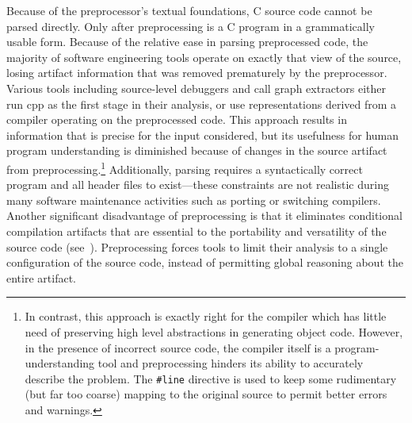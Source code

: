 \documentclass{article}
\newcommand{\Cpp}{\mbox{\textsf{cpp}}}
\newcommand{\C}{\mbox{C}}
\newcommand{\ppd}[1]{\texttt{\##1}}
\begin{document}
Because of the preprocessor's textual foundations, \C{} source code
cannot be parsed directly.  Only after preprocessing is a \C{}
program in a grammatically usable form. Because of the relative ease in
parsing preprocessed code, the majority of software engineering tools
operate on exactly that view of the source, losing artifact information
that was removed prematurely by the preprocessor.  Various tools including
source-level debuggers and call graph extractors
either run \Cpp{} as the first stage in their
analysis, or use representations derived from a compiler operating on
the preprocessed code.  This approach results in information that is
precise for the input considered, but its usefulness for human
program understanding is diminished because of changes in the source
artifact from preprocessing.\footnote{In contrast, this approach is
  exactly right for the compiler which has little need of preserving
  high level abstractions in generating object code.  However, in the
  presence of incorrect source code, the compiler itself is a
  program-understanding tool and preprocessing hinders its ability to
  accurately describe the problem.  The \ppd{line} directive is used to
  keep some rudimentary (but far too coarse) mapping to the original
  source to permit better errors and warnings.}  Additionally,
parsing requires a syntactically correct program and all header files to
exist---these constraints are not realistic during many software
maintenance activities such as porting or switching compilers.
Another significant disadvantage of preprocessing is that it eliminates
conditional compilation artifacts that are essential to the portability
and versatility of the source code (see~\cite{Krone94}).  Preprocessing
forces tools to limit their analysis to a single configuration of the
source code, instead of permitting global reasoning about the entire
artifact.

\end{document}
